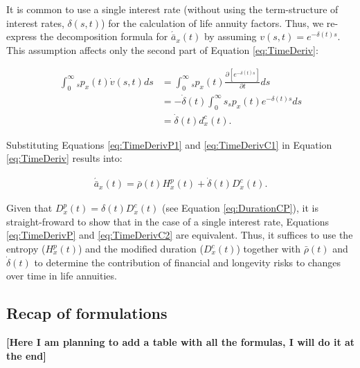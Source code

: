 \documentclass[12pt]{article}
\begin{document}
It is common to use a single interest rate (without using the term-structure of interest rates, $\delta(s,t)$) for the calculation of life annuity factors. Thus, we re-express the decomposition formula for $\acute{\bar{a}}_x(t)$ by assuming $v(s,t)=e^{-\delta(t)s}$. This assumption affects only the second part of Equation \ref{eq:TimeDeriv}: 




\begin{equation}\label{eq:TimeDerivC1}
\begin{split}
\int_0^\infty {}_s{p}_x(t) \dot{v}(s,t)ds &=\int_0^\infty {}_s{p}_x(t) \frac{\partial \left[ e^{-\delta(t)s} \right]}{\partial t}ds \\
&=-\dot{\delta}(t)\int_0^\infty s  {}_s{p}_x(t) e^{-\delta(t)s} ds \\
&=  \dot{\delta}(t)  d^{c}_x(t).
\end{split}
\end{equation}

Substituting Equations \ref{eq:TimeDerivP1} and \ref{eq:TimeDerivC1} in Equation \ref{eq:TimeDeriv} results into: 


\begin{equation}\label{eq:TimeDerivC2}
\begin{split}
\acute{\bar{a}}_x(t) =  \bar{\rho}(t){H}^{p}_x(t)+\dot{\delta}(t)  D^{c}_x(t).
\end{split}
\end{equation}



Given that ${D}^{p}_{x}(t)=\delta(t){D}^{c}_{x}(t)$ (see Equation \ref{eq:DurationCP}), it is straight-froward to show that in the case of a single interest rate, Equations \ref{eq:TimeDerivP}  and \ref{eq:TimeDerivC2} are equivalent. Thus, it suffices to use the entropy (${H}^{p}_x(t)$) and the modified duration ($D^{c}_x(t)$) together with $\bar{\rho}(t)$ and $\dot{\delta}(t)$ to determine the contribution of financial and longevity risks to changes over time in life annuities.





\subsection{Recap of formulations}




\textbf{[Here I am planning to add a table with all the formulas, I will do it at the end]}
\end{document}
